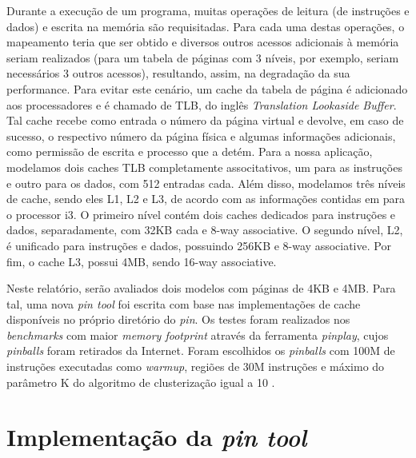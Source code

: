 \documentclass[12pt]{article}
\begin{document}
Durante a execução de um programa, muitas operações de leitura (de instruções
e dados) e escrita na memória são requisitadas. Para cada uma destas operações,
o mapeamento teria que ser obtido e diversos outros acessos
adicionais à memória seriam realizados (para um tabela de páginas com 3
níveis, por exemplo, seriam necessários 3 outros acessos), resultando, assim,
na degradação da sua performance. Para evitar este cenário, um cache da tabela
de página é adicionado aos processadores e é chamado de TLB, do inglês
\textit{Translation Lookaside Buffer}. Tal cache recebe como entrada o número da
página virtual e devolve, em caso de sucesso, o respectivo número da página
física e algumas informações adicionais, como permissão de escrita e processo
que a detém. Para a nossa aplicação, modelamos dois caches TLB completamente
associtativos, um para as instruções e outro para os dados, com 512 entradas
cada. Além disso, modelamos três níveis de cache, sendo eles L1, L2 e L3, de
acordo com as informações contidas em \cite{intel} para o processor i3.
O primeiro nível contém dois caches dedicados para instruções e dados,
separadamente, com 32KB cada e 8-way associative. O segundo nível, L2, é
unificado para instruções e dados, possuindo 256KB e 8-way associative. Por fim,
o cache L3, possui 4MB, sendo 16-way associative.

Neste relatório, serão avaliados dois modelos com páginas de 4KB e 4MB. Para
tal, uma nova \textit{pin tool} foi escrita com base nas implementações de cache
disponíveis no próprio diretório do \textit{pin}. Os testes foram realizados nos
\textit{benchmarks} com maior \textit{memory footprint} através da ferramenta
\textit{pinplay}, cujos \textit{pinballs} foram retirados da Internet. Foram
escolhidos os \textit{pinballs} com 100M de instruções executadas como
\textit{warmup}, regiões de 30M instruções e máximo do parâmetro K do
algoritmo de clusterização igual a 10 \cite{pinballs}. 

\section {Implementação da \textit{pin tool}}
\end{document}
